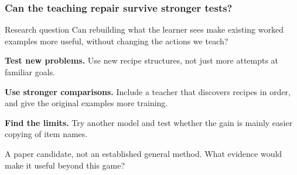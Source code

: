 \documentclass[aspectratio=169,12pt]{beamer}
\newcommand{\aside}[1]{\vfill{\footnotesize\color{Gray}#1\par}}
\begin{document}
\begin{frame}[t]
\frametitle{Can the teaching repair survive stronger tests?}
\begin{block}{Research question}
Can rebuilding what the learner sees make existing worked examples more useful, without changing the actions we teach?
\end{block}
\vspace{1mm}
\textbf{Test new problems.} Use new recipe structures, not just more attempts at familiar goals.
\smallskip

\textbf{Use stronger comparisons.} Include a teacher that discovers recipes in order, and give the original examples more training.
\smallskip

\textbf{Find the limits.} Try another model and test whether the gain is mainly easier copying of item names.
\aside{A paper candidate, not an established general method. What evidence would make it useful beyond this game?}
\end{frame}
\end{document}
